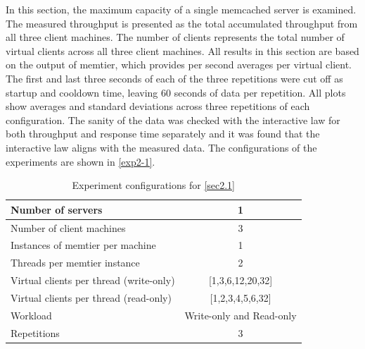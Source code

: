 \documentclass[11pt,a4paper]{article}
\begin{document}
In this section, the maximum capacity of a single memcached server is examined. The measured throughput is presented as the total accumulated throughput from all three client machines. The number of clients represents the total number of virtual clients across all three client machines. All results in this section are based on the output of memtier, which provides per second averages per virtual client. The first and last three seconds of each of the three repetitions were cut off as startup and cooldown time, leaving 60 seconds of data per repetition. All plots show averages and standard deviations across three repetitions of each configuration. The sanity of the data was checked with the interactive law for both throughput and response time separately and it was found that the interactive law aligns with the measured data. The configurations of the experiments are shown in \autoref{exp2-1}.

\begin{table}
    \centering
	\begin{tabular}{|l|c|}
		\hline Number of servers                        & 1                                 \\ 
		\hline Number of client machines                & 3                                 \\ 
		\hline Instances of memtier per machine         & 1                                 \\ 
		\hline Threads per memtier instance             & 2                                 \\
		\hline Virtual clients per thread (write-only)  & [1,3,6,12,20,32]                  \\ 
		\hline Virtual clients per thread (read-only)   & [1,2,3,4,5,6,32]                  \\ 
		\hline Workload                                 & Write-only and Read-only          \\
		\hline Repetitions                              & 3                                 \\ 
		\hline 
	\end{tabular}
	\caption{Experiment configurations for \autoref{sec2.1}} \label{exp2-1}
\end{table}
\end{document}
